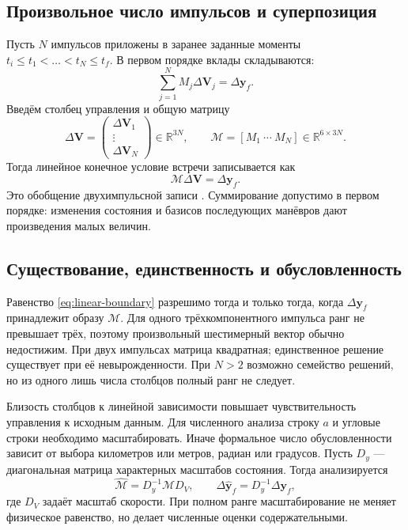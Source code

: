 \documentclass[a4paper,11pt]{article}
\newcommand{\R}{\mathbb R}
\numberwithin{equation}{section}
\theoremstyle{remark}
\newcommand{\vect}[1]{\boldsymbol{#1}}
\begin{document}
\subsection{Произвольное число импульсов и суперпозиция}

Пусть $N$ импульсов приложены в заранее заданные моменты
$t_i\le t_1<\ldots<t_N\le t_f$. В первом порядке вклады складываются:
\begin{equation}
 \sum_{j=1}^N M_j\Delta\vect V_j=\Delta\vect y_f.
 \label{eq:sum-boundary}
\end{equation}
Введём столбец управления и общую матрицу
\begin{equation}
 \Delta\vect V=
 \begin{pmatrix}\Delta\vect V_1\\\vdots\\\Delta\vect V_N\end{pmatrix}
 \in\R^{3N},\qquad
 \mathcal M=[M_1\ \cdots\ M_N]\in\R^{6\times3N}.
 \label{eq:stack-control}
\end{equation}
Тогда линейное конечное условие встречи записывается как
\begin{equation}
 \boxed{\mathcal M\Delta\vect V=\Delta\vect y_f.}
 \label{eq:linear-boundary}
\end{equation}
Это обобщение двухимпульсной записи \cite{chiniaev}.
Суммирование допустимо в первом порядке: изменения состояния
и базисов последующих манёвров дают произведения малых величин.

\subsection{Существование, единственность и обусловленность}

Равенство \eqref{eq:linear-boundary} разрешимо тогда и только тогда,
когда $\Delta\vect y_f$ принадлежит образу $\mathcal M$.
Для одного трёхкомпонентного импульса ранг не превышает трёх,
поэтому произвольный шестимерный вектор обычно недостижим.
При двух импульсах матрица квадратная; единственное решение
существует при её невырожденности. При $N>2$ возможно семейство
решений, но из одного лишь числа столбцов полный ранг не следует.

Близость столбцов к линейной зависимости повышает
чувствительность управления к исходным данным.
Для численного анализа строку $a$ и угловые строки необходимо
масштабировать. Иначе формальное число обусловленности зависит
от выбора километров или метров, радиан или градусов.
Пусть $D_y$ --- диагональная матрица характерных масштабов
состояния. Тогда анализируется
\[
 \widehat{\mathcal M}=D_y^{-1}\mathcal M D_V,
 \qquad
 \Delta\widehat{\vect y}_f=D_y^{-1}\Delta\vect y_f,
\]
где $D_V$ задаёт масштаб скорости.
При полном ранге масштабирование не меняет физическое равенство,
но делает численные оценки содержательными.
\end{document}
